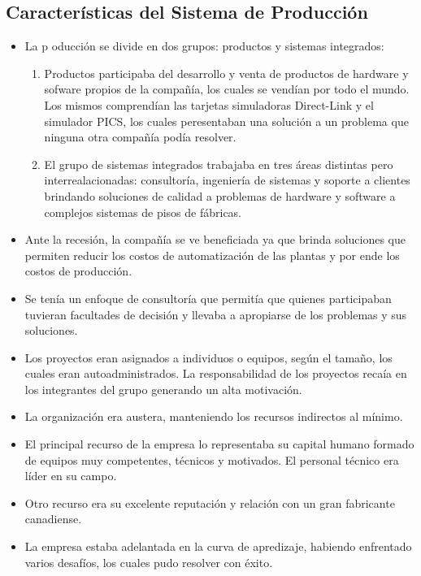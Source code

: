 \documentclass[12pt,a4paper,spanish]{article}
\begin{document}
	\subsection{Caracter\'{i}sticas del Sistema de Producci\'{o}n}
	\begin{itemize}
		\item La p oducci\'{o}n se divide en dos grupos: productos y sistemas integrados:
		\begin{enumerate}
			\item Productos participaba del desarrollo y venta de productos de hardware y sofware propios de la compa\~{n}\'{i}a, los cuales se vend\'{i}an por todo el mundo. Los mismos comprend\'{i}an las tarjetas simuladoras Direct-Link y el simulador PICS, los cuales peresentaban una soluci\'{o}n a un problema que ninguna otra compa\~{n}\'{i}a pod\'{i}a resolver.
			\item El grupo de sistemas integrados trabajaba en tres \'{a}reas distintas pero interrealacionadas: consultor\'{i}a, ingenier\'{i}a de sistemas y soporte a clientes brindando soluciones de calidad a problemas de hardware y software a complejos sistemas de pisos de f\'{a}bricas.
			\end{enumerate} 
		\item Ante la recesi\'{o}n, la compa\~{n}\'{i}a se ve beneficiada ya que brinda soluciones que permiten reducir los costos de automatizaci\'{o}n de las plantas y por ende los costos de producci\'{o}n.
		\item Se ten\'{i}a un enfoque de consultor\'{i}a que permit\'{i}a que quienes participaban tuvieran facultades de decisi\'{o}n y llevaba a apropiarse de los problemas y sus soluciones.
		\item Los proyectos eran asignados a individuos o equipos, seg\'{u}n el tama\~{n}o, los cuales eran autoadministrados. La responsabilidad de los proyectos reca\'{i}a en los integrantes del grupo generando un alta motivaci\'{o}n.
		\item La organizaci\'{o}n era austera, manteniendo los recursos indirectos al m\'{i}nimo.
		\item El principal recurso de la empresa lo representaba su capital humano formado de equipos muy competentes, t\'{e}cnicos y motivados. El personal t\'{e}cnico era l\'{i}der en su campo.
		\item Otro recurso era su excelente reputaci\'{o}n y relaci\'{o}n con un gran fabricante canadiense.
		\item La empresa estaba adelantada en la curva de apredizaje, habiendo enfrentado varios desaf\'{i}os, los cuales pudo resolver con \'{e}xito.
	\end{itemize}
\end{document}
